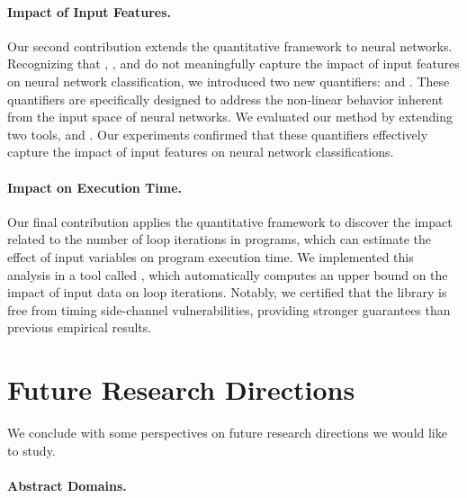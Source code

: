 \paragraph{Impact of Input Features.} Our second contribution extends the quantitative framework to neural networks.
Recognizing that \outcomesname{}, \rangename{}, and \qusedname{} do not meaningfully capture the impact of input features on neural network classification, we introduced two new quantifiers: \changesname{} and \qlibraname{}. These quantifiers are specifically designed to address the non-linear behavior inherent from the input space of neural networks.
We evaluated our method by extending two tools, \impatto{} and \libra{}.\sidenote{\libraurl}
Our experiments confirmed that these quantifiers effectively capture the impact of input features on neural network classifications.


\paragraph{Impact on Execution Time.} Our final contribution applies the quantitative framework to discover the impact related to the number of loop iterations in programs, which can estimate the effect of input variables on program execution time. We implemented this analysis in a tool called \timesec,\sidenote{\timesecurl} which automatically computes an upper bound on the impact of input data on loop iterations. Notably, we certified that the \bignum{} library\sidenote{\bignumurl} is free from timing side-channel vulnerabilities, providing stronger guarantees than previous empirical results.


\section*{Future Research Directions}

We conclude with some perspectives on future research directions we would like to study.

\paragraph{Abstract Domains.}

